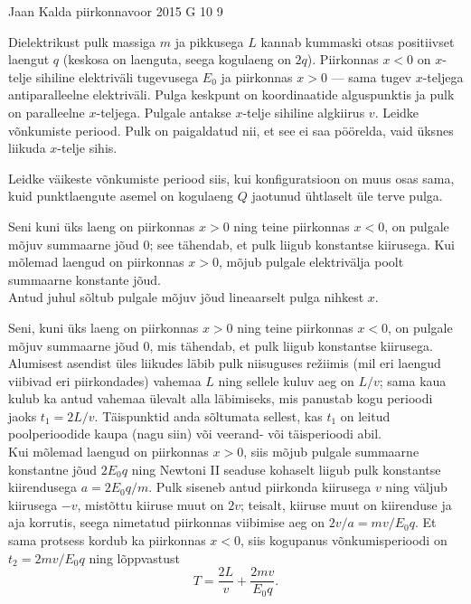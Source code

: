 {Jaan Kalda} %
{piirkonnavoor} %
{2015} %
{G 10} %
{9} %
{
\ifStatement
\osa Dielektrikust pulk massiga $m$ ja pikkusega $L$ kannab kummaski otsas positiivset laengut $q$ (keskosa on laenguta, seega kogulaeng on $2q$). Piirkonnas $x<0$ on $x$-telje sihiline elektriväli tugevusega $E_0$ ja piirkonnas $x>0$ --- sama tugev $x$-teljega antiparalleelne elektriväli. Pulga keskpunt on koordinaatide alguspunktis ja pulk on  paralleelne $x$-teljega. Pulgale antakse $x$-telje sihiline algkiirus $v$. Leidke võnkumiste periood. Pulk on paigaldatud nii, et see ei saa pöörelda, vaid üksnes liikuda $x$-telje sihis.

\osa Leidke väikeste võnkumiste periood siis, kui konfiguratsioon on muus osas sama, kuid punktlaengute asemel on kogulaeng $Q$ jaotunud ühtlaselt üle terve pulga.
\fi


\ifHint
\osa Seni kuni üks laeng on piirkonnas $x>0$ ning teine piirkonnas $x<0$, on pulgale mõjuv summaarne jõud \num{0}; see tähendab, et pulk liigub konstantse kiirusega. Kui mõlemad laengud on piirkonnas $x>0$, mõjub pulgale elektrivälja poolt summaarne konstante jõud.\\
\osa Antud juhul sõltub pulgale mõjuv jõud lineaarselt pulga nihkest $x$.
\fi


\ifSolution
\osa Seni, kuni üks laeng on piirkonnas $x>0$ ning teine piirkonnas $x<0$, on pulgale mõjuv summaarne jõud \num{0}, mis tähendab, et pulk liigub konstantse kiirusega. \\
Alumisest asendist üles liikudes läbib pulk niisuguses re\v ziimis
(mil eri laengud viibivad eri piirkondades) vahemaa $L$ ning
sellele kuluv aeg on $L/v$; sama kaua kulub ka antud vahemaa ülevalt alla
läbimiseks, mis  panustab kogu perioodi jaoks $t_1=2L/v$.
Täispunktid anda sõltumata sellest, kas $t_1$ on leitud poolperioodide kaupa (nagu siin) või veerand- või täisperioodi abil.\\
Kui mõlemad laengud on piirkonnas $x> 0$, siis mõjub pulgale summaarne konstantne jõud $2E_0q$
ning Newtoni II seaduse kohaselt liigub pulk konstantse kiirendusega
$a=2E_0q/m$. Pulk siseneb antud piirkonda kiirusega $v$ ning väljub kiirusega $-v$, mistõttu kiiruse muut on $2v$; teisalt,
kiiruse muut on kiirenduse ja aja korrutis, seega nimetatud piirkonnas viibimise
aeg on $2v/a=mv/E_0q$. Et sama protsess kordub ka piirkonnas $x<0$, siis
kogupanus võnkumisperioodi on $t_2=2mv/E_0q$ ning lõppvastust
\[ T=\frac{2L}v+\frac {2mv}{E_0q}. \]

}
